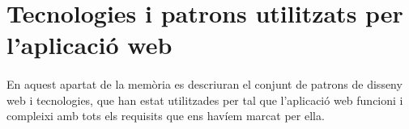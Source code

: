 \section{Tecnologies i patrons utilitzats per l'aplicació web}

    \paragraph{}
    En aquest apartat de la memòria es descriuran el conjunt de patrons de disseny web i tecnologies, que han estat utilitzades per tal que l'aplicació web funcioni i compleixi amb tots els requisits que ens havíem marcat per ella.

    
